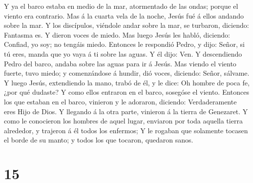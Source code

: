  Y ya el barco estaba en medio de la mar, atormentado de
las ondas; porque el viento era contrario.  Mas á la cuarta
vela de la noche, Jesús fué á ellos andando sobre la mar. 
Y los discípulos, viéndole andar sobre la mar, se turbaron, diciendo:
Fantasma es. Y dieron voces de miedo.  Mas luego Jesús les
habló, diciendo: Confiad, yo soy; no tengáis miedo. 
Entonces le respondió Pedro, y dijo: Señor, si tú eres, manda que yo
vaya á ti sobre las aguas.  Y él dijo: Ven. Y descendiendo
Pedro del barco, andaba sobre las aguas para ir á Jesús. 
Mas viendo el viento fuerte, tuvo miedo; y comenzándose á hundir, dió
voces, diciendo: Señor, sálvame.  Y luego Jesús,
extendiendo la mano, trabó de él, y le dice: Oh hombre de poca fe, ¿por
qué dudaste?  Y como ellos entraron en el barco, sosegóse
el viento.  Entonces los que estaban en el barco, vinieron
y le adoraron, diciendo: Verdaderamente eres Hijo de Dios. 
Y llegando á la otra parte, vinieron á la tierra de Genezaret.
 Y como le conocieron los hombres de aquel lugar, enviaron
por toda aquella tierra alrededor, y trajeron á él todos los enfermos;
 Y le rogaban que solamente tocasen el borde de su manto; y
todos los que tocaron, quedaron sanos.

\hypertarget{section-14}{%
\section{15}\label{section-14}}

